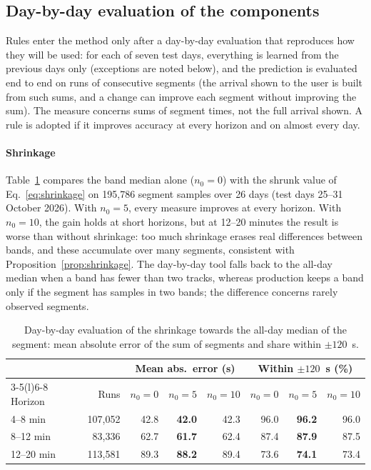 
\subsection{Day-by-day evaluation of the components}
\label{sec:day-by-day}

Rules enter the method only after a day-by-day evaluation that reproduces how they will be used: for each of seven
test days, everything is learned from the previous days only (exceptions are noted below), and the prediction is evaluated end to end on runs of
consecutive segments (the arrival shown to the user is built from such sums, and a change can improve each segment
without improving the sum). The measure concerns sums of segment times, not the full arrival shown. A rule is adopted if it improves accuracy at every horizon and on almost every day.

\paragraph{Shrinkage} Table~\ref{tab:shrinkage} compares the band median alone ($n_0=0$) with the shrunk value of
Eq.~\eqref{eq:shrinkage} on 195,786 segment samples over 26 days (test days 25--31 October 2026). With $n_0=5$, every
measure improves at every horizon. With $n_0=10$, the gain holds at short horizons, but at 12--20 minutes the result is
worse than without shrinkage: too much shrinkage erases real differences between bands, and these accumulate over many
segments, consistent with Proposition~\ref{prop:shrinkage}. The day-by-day tool falls back to the all-day median when a band has fewer than two tracks,
whereas production keeps a band only if the segment has samples in two bands; the difference concerns rarely observed
segments.

\begin{table}[t]
\centering
\caption{Day-by-day evaluation of the shrinkage towards the all-day median of the segment: mean absolute error of the
sum of segments and share within $\pm120$~s.}
\label{tab:shrinkage}
\small
\begin{tabular}{@{}lrrrrrrr@{}}
\toprule
& & \multicolumn{3}{c}{Mean abs.\ error (s)} & \multicolumn{3}{c}{Within $\pm120$~s (\%)} \\
\cmidrule(lr){3-5}\cmidrule(l){6-8}
Horizon & Runs & $n_0=0$ & $n_0=5$ & $n_0=10$ & $n_0=0$ & $n_0=5$ & $n_0=10$ \\
\midrule
4--8 min   & 107,052 & 42.8 & \textbf{42.0} & 42.3 & 96.0 & \textbf{96.2} & 96.0 \\
8--12 min  & 83,336  & 62.7 & \textbf{61.7} & 62.4 & 87.4 & \textbf{87.9} & 87.5 \\
12--20 min & 113,581 & 89.3 & \textbf{88.2} & 89.4 & 73.6 & \textbf{74.1} & 73.4 \\
\bottomrule
\end{tabular}
\end{table}

